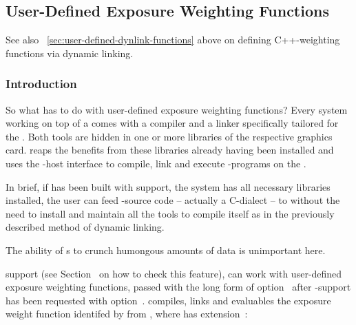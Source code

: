 

\subsection[User-Defined \acronym{OpenCL} Functions]{\label{sec:user-defined-opencl-functions}%
  User-Defined  Exposure Weighting Functions}

See also \sectionName~\ref{sec:user-defined-dynlink-functions} above on defining C++-weighting
functions via dynamic linking.


\subsubsection[Introduction]{\label{sec:user-defined-opencl-functions-introduction}%
  Introduction}

%
%

So what has  to do with user-defined exposure weighting functions?  Every
 system working on top of a  comes with a compiler and a linker
specifically tailored for the .  Both tools are hidden in one or more libraries
of the respective graphics card.  \App{} reaps the benefits from these libraries already having
been installed and uses the -host interface to compile, link and execute
-programs on the .

In brief, if \appcmd{} has been built with  support, the system has all
necessary libraries installed, the user can feed -source code -- actually a
C-dialect -- to \App{} without the need to install and maintain all the tools to compile
\appcmd{} itself as in the previously described method of dynamic linking.

The ability of s to crunch humongous amounts of data is unimportant here.

\noindent{}

 support (see Section~ on how to check this
feature), \App{} can work with user-defined exposure weighting functions, passed with the long
form of option~ after -support has been
requested with option~.  \App{} compiles, links and evaluables the exposure weight
function identifed by  from , where
 has extension~:

